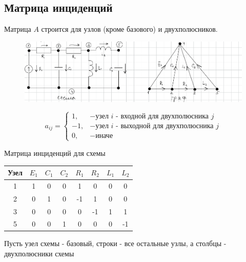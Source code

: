 	\vspace{-1em}
	
	\subsection{Матрица инциденций}
	
	Матрица $A$ строится для узлов (кроме базового) и двухполюсников.
	\begin{figure}[H]
		\centering
		\includegraphics[width=1\linewidth, height=0.2\textheight]{img/19_01}
		\label{fig:19_01}
	\end{figure}
	\vspace{-3em}
	\hspace{-2em}
	\begin{minipage}[c][5cm][c]{0.45\textwidth} %
		\[
		a_{ij} = 
		\begin{cases} 
			1, &- \text{узел $i$ - входной для двухполюсника $j$} \\ 
			-1, &- \text{узел $i$ - выходной для двухполюсника $j$} \\ 
			0, &- \text{иначе}
		\end{cases}
		\]
	\end{minipage}
	\hfill
	\begin{minipage}[c][5cm][c]{0.5\textwidth} %
		\centering
		{\small Матрица инциденций для схемы\vspace{0.5em}}
		\begin{tabular}{|c|c|c|c|c|c|c|c|}
			\hline
			Узел & $E_1$ & $C_1$ & $C_2$ & $R_1$ & $R_2$ & $L_1$ & $L_2$ \\
			\hline
			1 & 1 & 0 & 0 & 1 & 0 & 0 & 0 \\
			2 & 0 & 1 & 0 & -1 & 1 & 0 & 0 \\
			3 & 0 & 0 & 0 & 0 & -1 & 1 & 1 \\
			5 & 0 & 0 & 1 & 0 & 0 & 0 & -1 \\
			\hline
		\end{tabular}
	\end{minipage}
	
	Пусть узел схемы - базовый, строки - все остальные узлы, а столбцы - двухполюсники схемы
	
